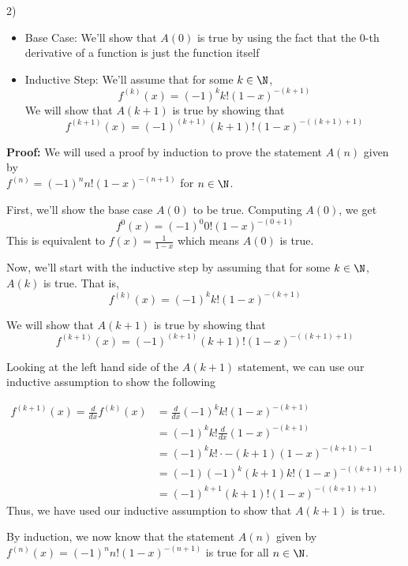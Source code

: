 \begin{paragraph}{2)}
\begin{itemize}
            \item{
                Base Case: We'll show that $A(0)$ is true by using the fact that the 0-th derivative of a function is just the function itself
            }

            \item{
                Inductive Step: We'll assume that for some $k \in \N$,
                $$f^{(k)}(x) = (-1)^k k! (1 - x)^{-(k + 1)}$$
                We will show that $A(k + 1)$ is true by showing that 
                $$f^{(k + 1)}(x) = (-1)^{(k + 1)} (k + 1)! (1-x)^{-((k + 1) + 1)}$$
            }
        \end{itemize}
        \spacing
        
        \textbf{Proof:} We will used a proof by induction to prove the statement $A(n)$ given by \\$f^{(n)} = (-1)^n n! (1 - x)^{-(n + 1)}$ for $n \in \N$.
        \spacing

        First, we'll show the base case $A(0)$ to be true. Computing $A(0)$, we get
        $$f^0(x) = (-1)^0 0! (1 - x)^{-(0 + 1)}$$
        This is equivalent to $f(x) = \frac{1}{1-x}$ which means $A(0)$ is true.
        \spacing

        Now, we'll start with the inductive step by assuming that for some $k \in \N$, $A(k)$ is true. That is,
        $$f^{(k)}(x) = (-1)^k k! (1 - x)^{-(k + 1)}$$

        We will show that $A(k + 1)$ is true by showing that 
        $$f^{(k + 1)}(x) = (-1)^{(k + 1)} (k + 1)! (1-x)^{-((k + 1) + 1)}$$

        Looking at the left hand side of the $A(k + 1)$ statement, we can use our inductive assumption to show the following
        
        \begin{align*}
            f^{(k + 1)}(x) = \frac{d}{dx}f^{(k)}(x) & = \frac{d}{dx} (-1)^k k! (1 - x)^{-(k + 1)}\\
            & = (-1)^k k! \frac{d}{dx} (1 - x)^{-(k + 1)} \\
            & = (-1)^k k! \cdot -(k + 1) (1-x)^{-(k + 1) - 1} \\
            & = (-1)(-1)^k (k + 1)k! (1 - x)^{-((k + 1) + 1)} \\
            & = (-1)^{k + 1} (k + 1)! (1 - x)^{-((k + 1) +1)}
        \end{align*}
        Thus, we have used our inductive assumption to show that $A(k + 1)$ is true.
        \spacing
        
        By induction, we now know that the statement $A(n)$ given by $f^{(n)}(x) = (-1)^n n! (1 - x)^{-(n + 1)}$ is true for all $n \in \N$.\\
        \proofEnd
    \end{paragraph}
    
